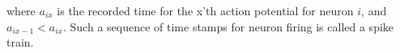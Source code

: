 where $a_{ix}$ is the recorded time for the x'th action potential for neuron $i$, and $a_{ix-1} < a_{ix}$. Such a sequence of time stamps for neuron firing is called a spike train.\\






\cleardoublepage